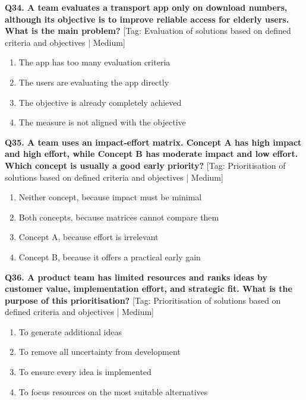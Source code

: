 \noindent\textbf{Q34. A team evaluates a transport app only on download numbers, although its objective is to improve reliable access for elderly users. What is the main problem?} \hfill [Tag: Evaluation of solutions based on defined criteria and objectives | Medium]
\begin{enumerate}[label=(\alph*),topsep=2pt,itemsep=1pt,partopsep=0pt,parsep=0pt]
    \item {The app has too many evaluation criteria}
    \item {The users are evaluating the app directly}
    \item {The objective is already completely achieved}
    \item {The measure is not aligned with the objective}
\end{enumerate}
\vspace{2mm}

\noindent\textbf{Q35. A team uses an impact-effort matrix. Concept A has high impact and high effort, while Concept B has moderate impact and low effort. Which concept is usually a good early priority?} \hfill [Tag: Prioritisation of solutions based on defined criteria and objectives | Medium]
\begin{enumerate}[label=(\alph*),topsep=2pt,itemsep=1pt,partopsep=0pt,parsep=0pt]
    \item {Neither concept, because impact must be minimal}
    \item {Both concepts, because matrices cannot compare them}
    \item {Concept A, because effort is irrelevant}
    \item {Concept B, because it offers a practical early gain}
\end{enumerate}
\vspace{2mm}

\noindent\textbf{Q36. A product team has limited resources and ranks ideas by customer value, implementation effort, and strategic fit. What is the purpose of this prioritisation?} \hfill [Tag: Prioritisation of solutions based on defined criteria and objectives | Medium]
\begin{enumerate}[label=(\alph*),topsep=2pt,itemsep=1pt,partopsep=0pt,parsep=0pt]
    \item {To generate additional ideas}
    \item {To remove all uncertainty from development}
    \item {To ensure every idea is implemented}
    \item {To focus resources on the most suitable alternatives}
\end{enumerate}
\vspace{2mm}

